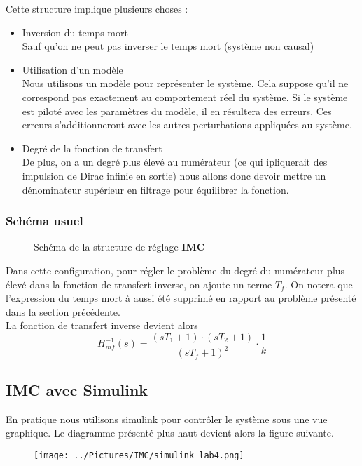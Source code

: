 Cette structure implique plusieurs choses :
\begin{itemize}
\item Inversion du temps mort\\
Sauf qu'on ne peut pas inverser le temps mort (système non causal)

\item Utilisation d'un modèle\\
Nous utilisons un modèle pour représenter le système. Cela suppose qu'il ne correspond pas exactement au comportement réel du système. Si le système est piloté avec les paramètres du modèle, il en résultera des erreurs. Ces erreurs s'additionneront avec les autres perturbations appliquées au système. 
 
\item Degré de la fonction de transfert\\
De plus, on a un degré plus élevé au numérateur (ce qui ipliquerait des impulsion de Dirac infinie en sortie) nous allons donc devoir mettre un dénominateur supérieur en filtrage pour équilibrer la fonction.
\end{itemize}

\subsubsection{Schéma usuel}
\begin{figure}[H]

\caption{Schéma de la structure de réglage \textbf{IMC}}
\end{figure}

Dans cette configuration, pour régler le problème du degré du numérateur plus élevé dans la fonction de transfert inverse, on ajoute un terme $T_{f}$. On notera que l'expression du temps mort à aussi été supprimé en rapport au problème présenté dans la section précédente.\\

La fonction de transfert inverse devient alors 
\begin{equation}
H_{mf}^{-1}(s) = \frac{(sT_{1} + 1) \cdot (sT_{2} + 1)}{(sT_{f} + 1)^{2}} \cdot \frac{1}{k}
\end{equation}

\subsection{IMC avec Simulink}
En pratique nous utilisons simulink pour contrôler le système sous une vue graphique. Le diagramme présenté plus haut devient alors la figure suivante.
\begin{figure}[H]
\texttt{[image: ../Pictures/IMC/simulink\_lab4.png]}
\end{figure}
